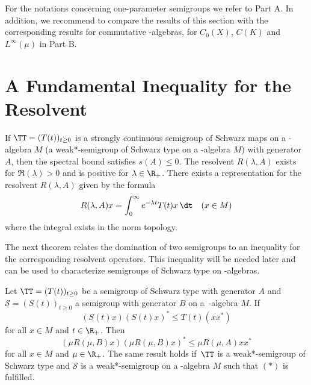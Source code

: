 For the notations concerning one-parameter semigroups we refer to Part A.
In addition, we recommend to compare the results of this section with the corresponding results for commutative \CA-algebras, \ie for $ C_{0}(X) $, $ C(K) $ and $ L^\infty(\mu) $ in Part B.
\section{A Fundamental Inequality for the Resolvent}\label{sec:d1-2}
If $ \TT = (T(t))_{t \geq 0} $ is a strongly continuous semigroup of Schwarz maps on a \CA-algebra $ M $ (\resp a weak*-semigroup of Schwarz type on a \WA-algebra $ M $) with generator $ A $, then the spectral bound satisfies $ s(A) \leq 0 $.
The resolvent $ R(\lambda, A) $ exists for $ \Re(\lambda) > 0 $ and is positive for $ \lambda \in \R_{+} $.
There exists a representation for the resolvent $ R(\lambda,A) $ given by the formula
\[
 	R(\lambda,A)x = \int_{0}^\infty e^{-\lambda t} T(t)x \, \dt  \quad (x \in M)
\]
where the integral exists in the norm topology.

The next theorem relates the domination of two semigroups to an inequality for the corresponding resolvent operators.
This inequality will be needed later and can be used to characterize semigroups of Schwarz type on \CA-algebras.
\begin{theorem}\label{thm:d1-2.1}
Let $  \TT  = (T(t))_{t\geq0} $ be a semigroup of Schwarz type with generator $ A $ and $ \mathcal{S} = (S(t))_{t\geq0} $ a semigroup with generator $ B $ on a\, \CA-algebra $ M $.
If
\begin{equation}
	(S(t)x)(S(t)x)^{*} \leq T(t)(xx^{*}) \tag{*}
\end{equation}
for all $ x \in M $ and $ t \in \R_{+} $. 
Then 
\[
	\left( \mu R(\mu,B)x \right) \left( \mu R(\mu,B)x \right)^{*} \leq \mu R(\mu,A)xx^{*}
\]
for all $ x \in M $ and $ \mu \in \R_{+} $.
The same result holds if $ \,\TT $ is a weak*-semigroup of Schwarz type and $ \mathcal{S} $ is a weak*-semigroup on a \WA-algebra $ M $ such that $ (*) $ is fulfilled.
\end{theorem}

